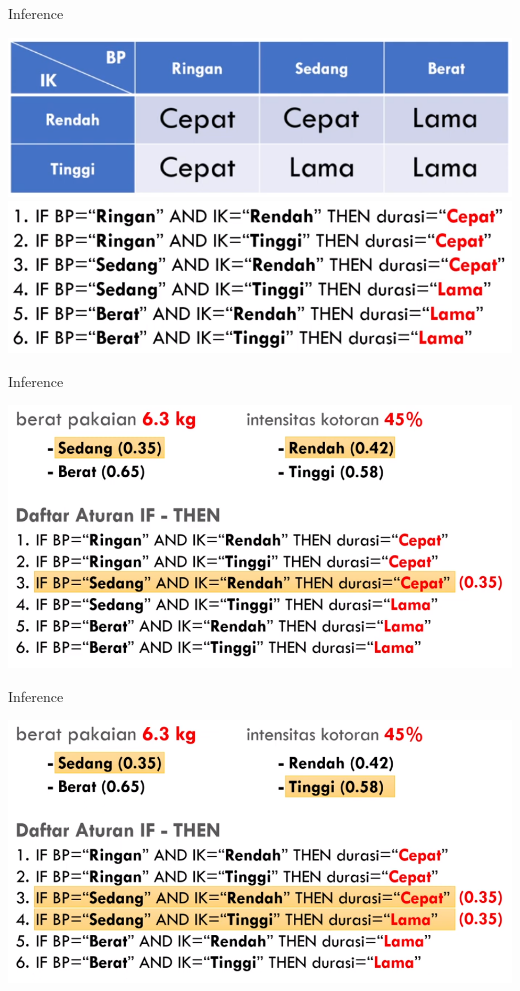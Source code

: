 \documentclass[pdflatex,compress,mathserif]{beamer}
\begin{document}
\begin{frame}{Inference}
	\begin{center}
		\includegraphics[height=0.3\textheight]{img/29a}
		\includegraphics[height=0.4\textheight]{img/29b}
	\end{center}
\end{frame}

\begin{frame}{Inference}
	\begin{center}
		\includegraphics[width=\linewidth]{img/30}
	\end{center}
\end{frame}

\begin{frame}{Inference}
	\begin{center}
		\includegraphics[width=\linewidth]{img/31}
	\end{center}
\end{frame}
\end{document}
